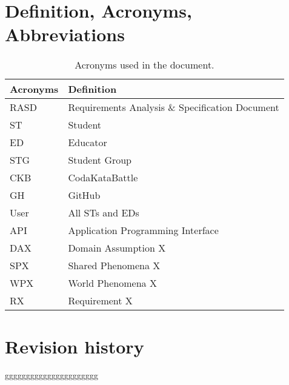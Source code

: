 \section{Definition, Acronyms, Abbreviations}
\label{sec:definition_acronyms_abbreviations}%
\begin{table}[H]
    \begin{center}
        \begin{tabular}{ |l|l| }
            \hline
            \textbf{Acronyms} & \textbf{Definition}                              \\
            \hline
            RASD             & Requirements Analysis \& Specification Document                      \\
            \hline
            ST              & Student                         \\
            \hline
            ED              & Educator                         \\
            \hline
            STG             & Student Group                    \\
            \hline
            CKB             & CodaKataBattle                   \\
            \hline
            GH              & GitHub                           \\
            \hline
            User            & All STs and EDs                           \\
            \hline
            API             & Application Programming Interface                           \\
            \hline
            DAX             & Domain Assumption X                           \\
            \hline
            SPX             & Shared Phenomena X                           \\
            \hline
            WPX             & World Phenomena X                           \\
            \hline
            RX              & Requirement X                           \\
            \hline
         \end{tabular}
        \caption{Acronyms used in the document.}
        \label{tab:acronyms}%
    \end{center}
\end{table}




\section{Revision history}
\label{sec:revision_history}%
gggggggggggggggggggggg

